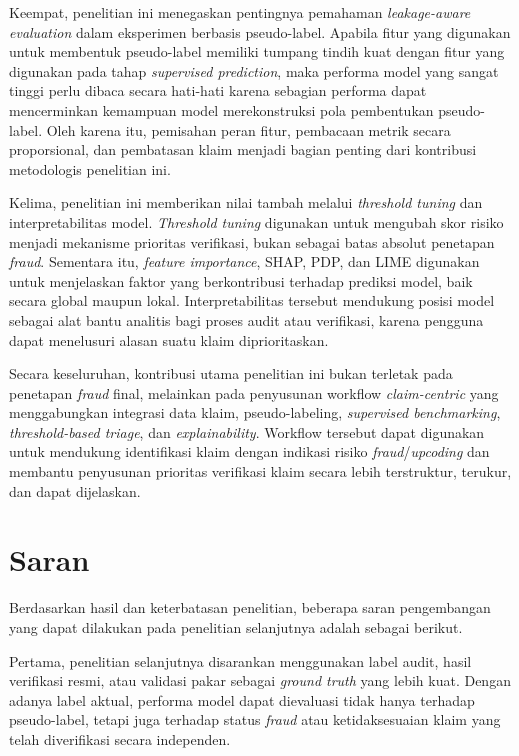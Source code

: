 Keempat, penelitian ini menegaskan pentingnya pemahaman \emph{leakage-aware evaluation} dalam eksperimen berbasis pseudo-label. Apabila fitur yang digunakan untuk membentuk pseudo-label memiliki tumpang tindih kuat dengan fitur yang digunakan pada tahap \emph{supervised prediction}, maka performa model yang sangat tinggi perlu dibaca secara hati-hati karena sebagian performa dapat mencerminkan kemampuan model merekonstruksi pola pembentukan pseudo-label. Oleh karena itu, pemisahan peran fitur, pembacaan metrik secara proporsional, dan pembatasan klaim menjadi bagian penting dari kontribusi metodologis penelitian ini.

Kelima, penelitian ini memberikan nilai tambah melalui \emph{threshold tuning} dan interpretabilitas model. \emph{Threshold tuning} digunakan untuk mengubah skor risiko menjadi mekanisme prioritas verifikasi, bukan sebagai batas absolut penetapan \emph{fraud}. Sementara itu, \emph{feature importance}, SHAP, PDP, dan LIME digunakan untuk menjelaskan faktor yang berkontribusi terhadap prediksi model, baik secara global maupun lokal. Interpretabilitas tersebut mendukung posisi model sebagai alat bantu analitis bagi proses audit atau verifikasi, karena pengguna dapat menelusuri alasan suatu klaim diprioritaskan.

Secara keseluruhan, kontribusi utama penelitian ini bukan terletak pada penetapan \emph{fraud} final, melainkan pada penyusunan workflow \emph{claim-centric} yang menggabungkan integrasi data klaim, pseudo-labeling, \emph{supervised benchmarking}, \emph{threshold-based triage}, dan \emph{explainability}. Workflow tersebut dapat digunakan untuk mendukung identifikasi klaim dengan indikasi risiko \emph{fraud}/\emph{upcoding} dan membantu penyusunan prioritas verifikasi klaim secara lebih terstruktur, terukur, dan dapat dijelaskan.

\section{Saran}\label{saran}

Berdasarkan hasil dan keterbatasan penelitian, beberapa saran pengembangan yang dapat dilakukan pada penelitian selanjutnya adalah sebagai berikut.

Pertama, penelitian selanjutnya disarankan menggunakan label audit, hasil verifikasi resmi, atau validasi pakar sebagai \emph{ground truth} yang lebih kuat. Dengan adanya label aktual, performa model dapat dievaluasi tidak hanya terhadap pseudo-label, tetapi juga terhadap status \emph{fraud} atau ketidaksesuaian klaim yang telah diverifikasi secara independen.

